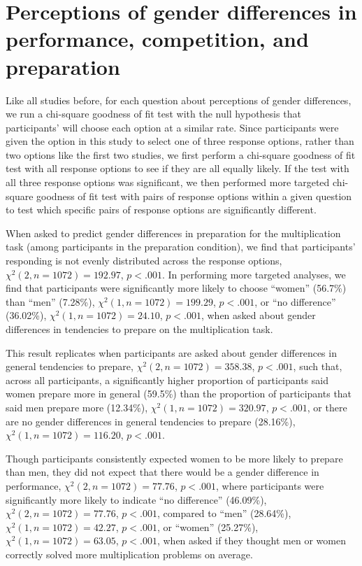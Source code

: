 \documentclass[a4paper,nobind]{templates/ociamthesis}
\begin{document}
\hypertarget{perceptions-of-gender-differences-in-performance-competition-and-preparation}{%
\section{Perceptions of gender differences in performance, competition, and preparation}\label{perceptions-of-gender-differences-in-performance-competition-and-preparation}}

Like all studies before, for each question about perceptions of gender differences, we run a chi-square goodness of fit test with the null hypothesis that participants' will choose each option at a similar rate. Since participants were given the option in this study to select one of three response options, rather than two options like the first two studies, we first perform a chi-square goodness of fit test with all response options to see if they are all equally likely. If the test with all three response options was significant, we then performed more targeted chi-square goodness of fit test with pairs of response options within a given question to test which specific pairs of response options are significantly different.

When asked to predict gender differences in preparation for the multiplication task (among participants in the preparation condition), we find that participants' responding is not evenly distributed across the response options, \(\chi^2(2, n = 1072) = 192.97\), \(p < .001\). In performing more targeted analyses, we find that participants were significantly more likely to choose ``women'' (56.7\%) than ``men'' (7.28\%), \(\chi^2(1, n = 1072) = 199.29\), \(p < .001\), or ``no difference'' (36.02\%), \(\chi^2(1, n = 1072) = 24.10\), \(p < .001\), when asked about gender differences in tendencies to prepare on the multiplication task.

This result replicates when participants are asked about gender differences in general tendencies to prepare, \(\chi^2(2, n = 1072) = 358.38\), \(p < .001\), such that, across all participants, a significantly higher proportion of participants said women prepare more in general (59.5\%) than the proportion of participants that said men prepare more (12.34\%), \(\chi^2(1, n = 1072) = 320.97\), \(p < .001\), or there are no gender differences in general tendencies to prepare (28.16\%), \(\chi^2(1, n = 1072) = 116.20\), \(p < .001\).

Though participants consistently expected women to be more likely to prepare than men, they did not expect that there would be a gender difference in performance, \(\chi^2(2, n = 1072) = 77.76\), \(p < .001\), where participants were significantly more likely to indicate ``no difference'' (46.09\%), \(\chi^2(2, n = 1072) = 77.76\), \(p < .001\), compared to ``men'' (28.64\%), \(\chi^2(1, n = 1072) = 42.27\), \(p < .001\), or ``women'' (25.27\%), \(\chi^2(1, n = 1072) = 63.05\), \(p < .001\), when asked if they thought men or women correctly solved more multiplication problems on average.
\end{document}
